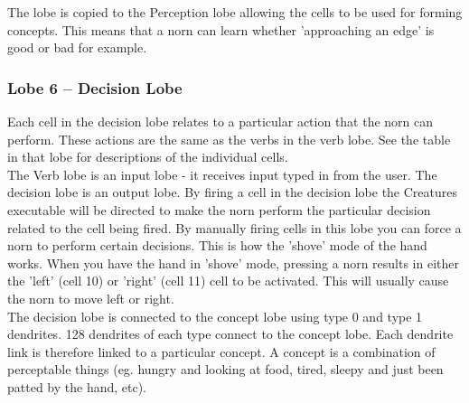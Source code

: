 \documentclass[11pt,twoside,a4paper]{article}
\begin{document}
The lobe is copied to the Perception lobe allowing the cells to be used for forming concepts. This means that a norn can learn whether 'approaching an edge' is good or bad for example.

\subsubsection{Lobe 6 -- Decision Lobe}

Each cell in the decision lobe relates to a particular action that the norn can perform. These actions are the same as the verbs in the verb lobe. See the table in that lobe for descriptions of the individual cells.~\\

The Verb lobe is an input lobe - it receives input typed in from the user. The decision lobe is an output lobe. By firing a cell in the decision lobe the Creatures executable will be directed to make the norn perform the particular decision related to the cell being fired. By manually firing cells in this lobe you can force a norn to perform certain decisions. This is how the 'shove' mode of the hand works. When you have the hand in 'shove' mode, pressing a norn results in either the 'left' (cell 10) or 'right' (cell 11) cell to be activated. This will usually cause the norn to move left or right.~\\


The decision lobe is connected to the concept lobe using type 0 and type 1 dendrites. 128 dendrites of each type connect to the concept lobe. Each dendrite link is therefore linked to a particular concept. A concept is a combination of perceptable things (eg. hungry and looking at food, tired, sleepy and just been patted by the hand, etc).~\\

\clearpage
\end{document}

